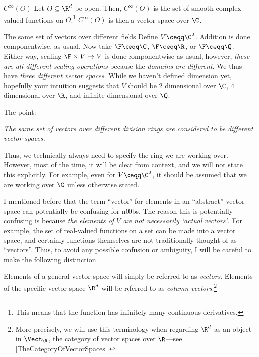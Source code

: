 \begin{exm}{$C^{\infty}(O)$}{}
	Let $O\subseteq \R ^d$ be open.  Then, $C^{\infty}(O)$ is the set of smooth complex-valued functions on $O$.\footnote{This means that the function has infinitely-many continuous derivatives.}  $C^{\infty}(O)$ is then a vector space over $\C$.
\end{exm}
\begin{exm}{The same set of vectors over different fields}{}
	Define $V\ceqq \C ^2$.  Addition is done componentwise, as usual.  Now take $\F \ceqq \C$, $\F \ceqq \R$, or $\F \ceqq \Q$.  Either way, scaling $\F \times V\rightarrow V$ is done componentwise as usual, however, \emph{these are all different scaling operations} because the \emph{domains are different}.  We thus have \emph{three different vector spaces}.  While we haven't defined dimension yet, hopefully your intuition suggests that $V$ should be $2$ dimensional over $\C$, $4$ dimensional over $\R$, and infinite dimensional over $\Q$.
	
	The point:
	\begin{displayquote}
		\emph{The same set of vectors over different division rings are considered to be different vector spaces.}
	\end{displayquote}
	\begin{rmk}
		Thus, we technically always need to specify the ring we are working over.  However, most of the time, it will be clear from context, and we will not state this explicitly.  For example, even for $V\ceqq \C ^2$, it should be assumed that we are working over $\C$ unless otherwise stated.
	\end{rmk}
\end{exm}

I mentioned before that the term ``vector'' for elements in an ``abstract'' vector space can potentially be confusing for n00bs.  The reason this is potentially confusing is because \emph{the elements of $V$ are not necessarily `actual vectors'}.  For example, the set of real-valued functions on a set can be made into a vector space, and certainly functions themselves are not traditionally thought of as ``vectors''.  Thus, to avoid any possible confusion or ambiguity, I will be careful to make the following distinction.
\begin{displayquote}
	Elements of a general vector space will simply be referred to as \emph{vectors}.  Elements of the specific vector space $\R ^d$ will be referred to as \emph{column vectors}.\footnote{More precisely, we will use this terminology when regarding $\R ^d$ as an object in $\Vect _{\R}$, the category of vector spaces over $\R$---see \cref{TheCategoryOfVectorSpaces}.}
\end{displayquote}

